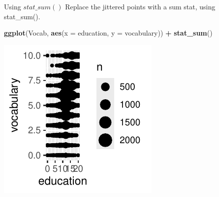 \documentclass[
  ignorenonframetext,
]{beamer}
\newenvironment{Shaded}{\begin{snugshade}}{\end{snugshade}}
\newcommand{\AttributeTok}[1]{\textcolor[rgb]{0.13,0.29,0.53}{#1}}
\newcommand{\FunctionTok}[1]{\textcolor[rgb]{0.13,0.29,0.53}{\textbf{#1}}}
\newcommand{\NormalTok}[1]{#1}
\newcommand{\SpecialCharTok}[1]{\textcolor[rgb]{0.81,0.36,0.00}{\textbf{#1}}}
\begin{document}
\begin{frame}[fragile]{Using \(stat\_sum()\)}
\label{using-stat_sum-4}
Replace the jittered points with a sum stat, using stat\_sum().


\begin{Shaded}
\begin{Highlighting}[]
\FunctionTok{ggplot}\NormalTok{(Vocab, }\FunctionTok{aes}\NormalTok{(}\AttributeTok{x =}\NormalTok{ education, }\AttributeTok{y =}\NormalTok{ vocabulary)) }\SpecialCharTok{+} \FunctionTok{stat\_sum}\NormalTok{()}
\end{Highlighting}
\end{Shaded}

\begin{center}\includegraphics[width=0.5\linewidth]{Figs/unnamed-chunk-21-1} \end{center}
\end{frame}
\end{document}
